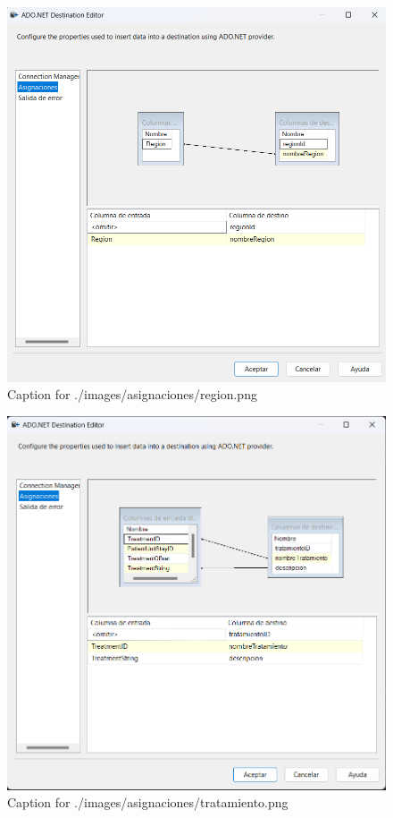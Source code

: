 \documentclass{article}
\begin{document}
\begin{figure}[H]
  \centering
  \includegraphics[width=\linewidth]{./images/asignaciones/region.png}
  \caption{Caption for ./images/asignaciones/region.png}
\end{figure}
\begin{figure}[H]
  \centering
  \includegraphics[width=\linewidth]{./images/asignaciones/tratamiento.png}
  \caption{Caption for ./images/asignaciones/tratamiento.png}
\end{figure}
\end{document}
